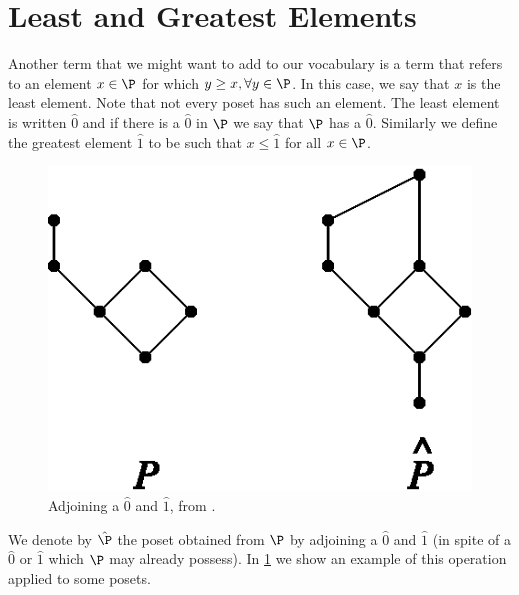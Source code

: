 \section{Least and Greatest Elements}
\label{tree:poset:leastandgreatest}

Another term that we might want to add to our vocabulary is a term that refers
to an element $x \in \P$ for which $y \geq x, \forall y \in \P$. In this case,
we say that $x$ is the least element. Note that not every poset has such an
element. The least element is written $\hat{0}$ and if there is a $\hat{0}$ in
$\P$ we say that $\P$ has a $\hat{0}$. Similarly we define the greatest element
$\hat{1}$ to be such that $x \leq \hat{1}$ for all $x \in \P$.

\begin{figure}
	\centering
	\includegraphics[height=0.2\textheight]{fig/stanley/3-3}
	\caption{\label{fig:stanley:3-3} Adjoining a $\hat{0}$ and $\hat{1}$, from
\citet*{Stanley:2011:ECV:2124415}.}
\end{figure}

We denote by \(\hat{\P}\) the poset obtained from \(\P\) by adjoining a
\(\hat{0}\) and \(\hat{1}\) (in spite of a \(\hat{0}\) or \(\hat{1}\) which
\(\P\) may already possess). In \ref{fig:stanley:3-3} we show an example of
this operation applied to some posets.

